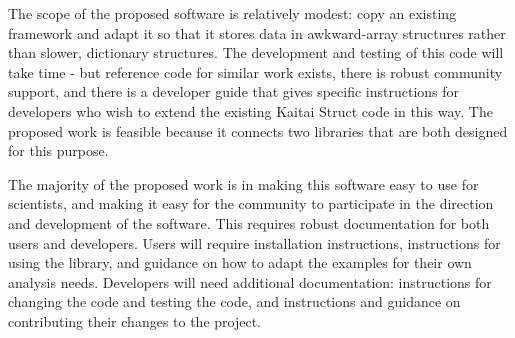 The scope of the proposed software is relatively modest: copy an existing framework and adapt it so that it stores data in awkward-array structures rather than slower, dictionary structures.  The development and testing of this code will take time - but reference code for similar work exists, there is robust community support, and there is a developer guide that gives specific instructions for developers who wish to extend the existing Kaitai Struct code in this way.  The proposed work is feasible because it connects two libraries that are both designed for this purpose.

The majority of the proposed work is in making this software easy to use for scientists, and making it easy for the community to participate in the direction and development of the software.  This requires robust documentation for both users and developers.  Users will require installation instructions, instructions for using the library, and guidance on how to adapt the examples for their own analysis needs.  Developers will need additional documentation: instructions for changing the code and testing the code, and instructions and guidance on contributing their changes to the project.

